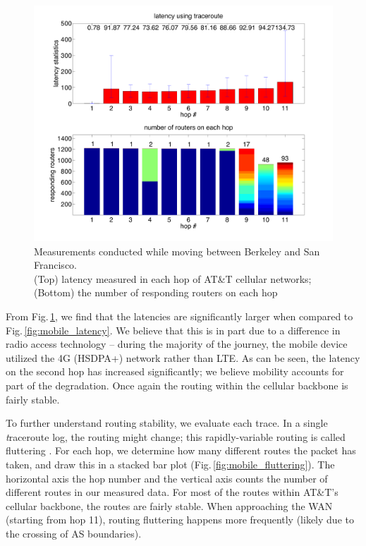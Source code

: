 \begin{figure}[!tbh]
  \centering
  \includegraphics[width=\linewidth]{../figs/mobile_sfo.pdf}
  \vspace{-1em}
  \caption{Measurements conducted while moving between Berkeley and San Francisco.\\ (Top) latency measured in each hop of AT\&T cellular networks; (Bottom) the number of responding routers on each hop}
  \label{fig:mobile_mobile}
\end{figure}

From Fig.\,\ref{fig:mobile_mobile}, we find that the latencies are significantly larger when compared to Fig.\,\ref{fig:mobile_latency}. We believe that this is in part due to a difference in radio access technology -- during the majority of the journey, the mobile device utilized the 4G (HSDPA+) network rather than LTE. As can be seen, the latency on the second hop has increased significantly; we believe mobility accounts for part of the degradation. Once again the routing within the cellular backbone is fairly stable.

To further understand routing stability, we evaluate each trace. In a single {\textit traceroute} log, the routing might change; this rapidly-variable routing is called fluttering \cite{paxson1997measurements}. For each hop, we determine how many different routes the packet has taken, and draw this in a stacked bar plot (Fig.\,\ref{fig:mobile_fluttering}). The horizontal axis the hop number and the vertical axis counts the number of different routes in our measured data. For most of the routes within AT\&T's cellular backbone, the routes are fairly stable. When approaching the WAN (starting from hop 11), routing fluttering happens more frequently (likely due to the crossing of AS boundaries).

